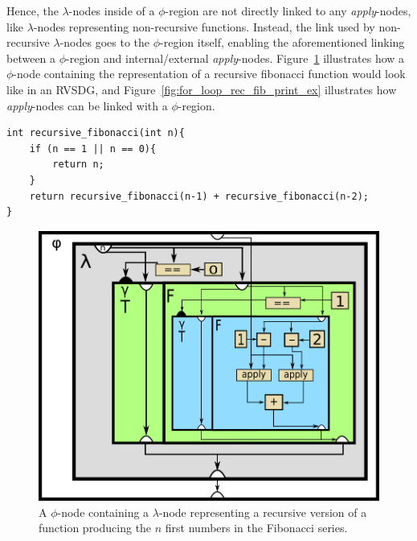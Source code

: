 \begin{itemize}
Hence, the $\lambda$-nodes inside of a $\phi$-region are not directly linked to
any \textit{apply}-nodes, like $\lambda$-nodes representing non-recursive
functions. Instead, the link used by non-recursive $\lambda$-nodes goes to the
$\phi$-region itself, enabling the aforementioned linking between a
$\phi$-region and internal/external \textit{apply}-nodes.
Figure~\ref{fig:rec_fib_phi} illustrates how a $\phi$-node containing the
representation of a recursive fibonacci function would look like in an RVSDG,
and Figure~\ref{fig:for_loop_rec_fib_print_ex} illustrates how
\textit{apply}-nodes can be linked with a $\phi$-region.

\end{itemize}

\begin{lstlisting}[label={lst:rec_fib_phi}, style=customcpp,
caption={C/C++ code corresponding to the RVSDG subgraph in
Figure~\ref{fig:for_loop_rec_fib_print_ex}, which represents a simple recursive
fibonacci function.}]
int recursive_fibonacci(int n){
	if (n == 1 || n == 0){
		return n;
	}
	return recursive_fibonacci(n-1) + recursive_fibonacci(n-2);
}
\end{lstlisting}
\vspace{-4\parskip} %

\begin{figure}[h!]
	\centering
	\includegraphics[width=\textwidth]{figures/recursive_fibonacci}
	\caption{A $\phi$-node containing a $\lambda$-node representing a recursive
version of a function producing the $n$ first numbers in the Fibonacci series.}
	\label{fig:rec_fib_phi}
\end{figure}
